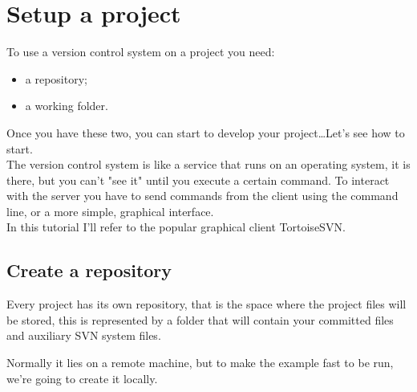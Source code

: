 \newpage










\section{Setup a project}
\label{section:SetupProject}


To use a version control system on a project you need:

\begin{itemize}

    \item a repository;
    
    \item a working folder.

\end{itemize}

Once you have these two, you can start to develop your project\ldots Let's see how to start.\\


The version control system is like a service that runs on an operating system, it is there, but you can't "see it" until you execute a certain command. To interact with the server you have to send commands from the client using the command line, or a more simple, graphical interface.\\

In this tutorial I'll refer to the popular graphical client TortoiseSVN.






\subsection{Create a repository}
\label{subsection:CreateRepository}



Every project has its own repository, that is the space where the project files will be stored, this is represented by a folder that will contain your committed files and auxiliary SVN system files.

Normally it lies on a remote machine, but to make the example fast to be run, we're going to create it locally.

